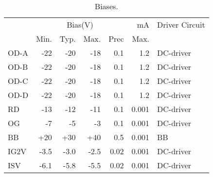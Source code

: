 \documentclass[a4paper,12pt]{article}
\begin{document}

\begin{table}[h]
\centering
\begin{tabular}{|l|rrrr|r|l|}
\hline
&\multicolumn{4}{c|}{Bias(V)} &mA&Driver Circuit \\
&Min.& Typ.& Max.&Prec& Max.&\\
\hline
OD-A &-22 &-20& -18& 0.1&1.2&DC-driver \\
OD-B &-22 &-20& -18& 0.1&1.2&DC-driver \\
OD-C &-22 &-20& -18& 0.1&1.2&DC-driver \\
OD-D &-22 &-20& -18& 0.1&1.2&DC-driver \\
RD &-13& -12 &-11& 0.1&0.001&DC-driver \\
OG& -7& -5& -3&  0.1&0.001&DC-driver \\
BB &+20 &+30 &+40 &0.5&0.001&BB \\
IG2V&-3.5&-3.0&-2.5&0.02&0.001&DC-driver \\
ISV&-6.1&-5.8&-5.5&0.02&0.001&DC-driver \\
\hline
\end{tabular}
 \caption{Biases.}
 \label{Biases}
\end{table}






\end{document}
